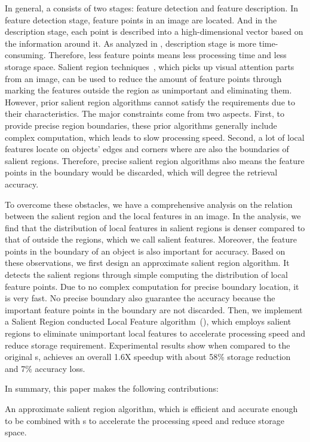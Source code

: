 In general, a {\lfea} consists of two stages: feature detection and feature description. In feature detection stage, feature points in an image are located. And in the description stage, each point is described into a high-dimensional vector based on the information around it. As analyzed in \cite{adaptivepipelineicpp2012}, description stage is more time-consuming. Therefore, less feature points means less processing time and less storage space. Salient region techniques~\cite{cheng2011global,achanta2009frequency,itti1998model}, which picks up visual attention parts from an image, can be used to reduce the amount of feature points through marking the features outside the region as unimportant and eliminating them. However, prior salient region algorithms cannot satisfy the requirements due to their characteristics. The major constraints come from two aspects. First, to provide precise region boundaries, these prior algorithms generally include complex computation, which leads to slow processing speed. Second, a lot of local features locate on objects' edges and corners where are also the boundaries of salient regions. Therefore, precise salient region algorithms also means the feature points in the boundary would be discarded, which will degree the retrieval accuracy. 

To overcome these obstacles, we have a comprehensive analysis on the relation between the salient region and the local features in an image. In the analysis, we find that the distribution of local features in salient regions is denser compared to that of outside the regions, which we call salient features. Moreover, the feature points in the boundary of an object is also important for accuracy. Based on these observations, we first design an approximate salient region algorithm. It detects the salient regions through simple computing the distribution of local feature points. Due to no complex computation for precise boundary location, it is very fast. No precise boundary also guarantee the accuracy because the important feature points in the boundary are not discarded. Then, we implement a Salient Region conducted Local Feature algorithm~({\sys}), which employs salient regions to eliminate unimportant local features to accelerate processing speed and reduce storage requirement.  Experimental results show when compared to the original {\lfea}s, {\sys} achieves an overall 1.6X speedup with about 58\% storage reduction and 7\% accuracy loss.

In summary, this paper makes the following contributions:
\squishlist
\item An approximate salient region algorithm, which is efficient and accurate enough to be combined with {\lfea}s to accelerate the processing speed and reduce storage space.

